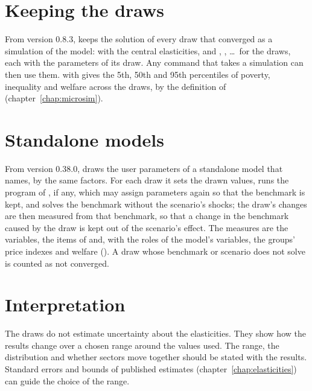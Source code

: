 \section{Keeping the draws}

From version 0.8.3, \cmd{)} keeps the solution of every
draw that converged as a simulation of the model:  with the
central elasticities, and , , \ldots\ for the
draws, each with the parameters of its draw. Any command that takes a
simulation can then use them.  with
\cmd{)} gives the 5th, 50th and 95th percentiles of
poverty, inequality and welfare across the draws, by the definition of
 (chapter~\ref{chap:microsim}).

\section{Standalone models}\label{sec:sa-sens}

From version 0.38.0,  draws the user parameters of a
standalone model that  names, by the same factors. For each
draw it sets the drawn values, runs the program of , if
any, which may assign parameters again so that the benchmark is kept, and
solves the benchmark without the scenario's shocks; the draw's changes are
then measured from that benchmark, so that a change in the benchmark caused
by the draw is kept out of the scenario's effect. The measures are the
variables, the items of  and, with the roles of the model's
variables, the groups' price indexes and welfare ().
A draw whose benchmark or scenario does not solve is counted as not
converged.

\section{Interpretation}

The draws do not estimate uncertainty about the elasticities. They show how
the results change over a chosen range around the values used. The range, the
distribution and whether sectors move together should be stated with the
results. Standard errors and bounds of published estimates
(chapter~\ref{chap:elasticities}) can guide the choice of the range.

